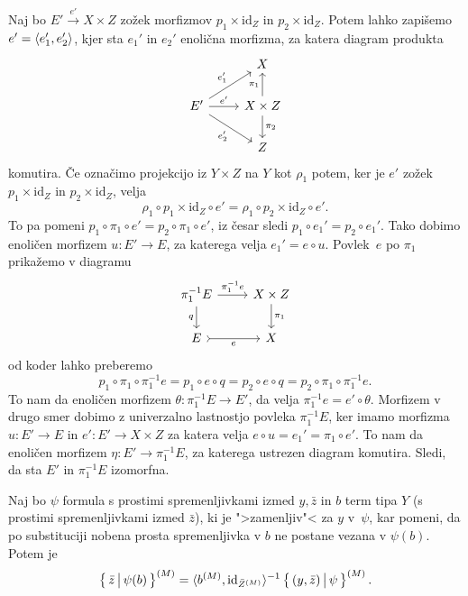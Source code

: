 \documentclass[../kategoricna_logika.tex]{subfiles}
\begin{document}
  \begin{dokaz}
    Naj bo $E' \xrightarrow{e'} X \times Z$ zožek morfizmov
    $p_1 \times \mathrm{id}_Z$ in $p_2 \times \mathrm{id}_Z$. Potem
    lahko zapišemo $e' = \langle e'_1, e'_2 \rangle$, kjer sta $e_1'$ in
    $e_2'$ enolična morfizma, za katera diagram produkta
    \begin{equation*}
      \begin{tikzcd}[row sep = normal]
        & X \\
        E' \ar[ur, "e_1'"] \ar[r, "e'"] \ar[dr, "e_2'"'] & X \times Z
        \ar[u, "\pi_1"] \ar[d, "\pi_2"] \\
        & Z
      \end{tikzcd}
    \end{equation*}
    komutira. Če označimo projekcijo iz $Y \times Z$ na $Y$ kot
    $\rho_1$ potem, ker je $e'$ zožek $p_1 \times \mathrm{id}_Z$ in
    $p_2 \times \mathrm{id}_Z$, velja
    \[ \rho_1 \circ p_1 \times \mathrm{id}_Z \circ e' = \rho_1 \circ
      p_2 \times \mathrm{id}_Z \circ e'.\] To pa pomeni
    $p_1 \circ \pi_1 \circ e' = p_2 \circ \pi_1 \circ e'$, iz česar
    sledi $p_1 \circ e_1' = p_2 \circ e_1'$. Tako dobimo enoličen
    morfizem $u : E' \to E$, za katerega velja $e_1' = e \circ
    u$. Povlek~$e$ po $\pi_1$ prikažemo v diagramu
    \begin{equation*}
      \begin{tikzcd}
        \pi_1^{-1}E \ar[d, "q"'] \ar[r, "\pi_1^{-1}e"] & X \times Z \ar[d, "\pi_1"] \\
        E \ar[r, tail, "e"'] & X
      \end{tikzcd}
    \end{equation*}
    od koder lahko preberemo
    \[ p_1 \circ \pi_1 \circ \pi_1^{-1}e = p_1 \circ e \circ q = p_2
      \circ e \circ q = p_2 \circ \pi_1 \circ \pi_1^{-1}e.\] To nam da
    enoličen morfizem $\theta : \pi_1^{-1}E \to E'$, da velja
    $\pi_1^{-1}e = e' \circ \theta$.  Morfizem v drugo smer dobimo z
    univerzalno lastnostjo povleka $\pi_1^{-1}E$, ker imamo morfizma
    $u : E' \to E$ in $e' : E' \to X \times Z$ za katera velja
    $e \circ u = e_1' = \pi_1 \circ e'$. To nam da enoličen morfizem
    $\eta : E' \to \pi_1^{-1}E$, za katerega ustrezen diagram
    komutira.  Sledi, da sta $E'$ in $\pi_1^{-1}E$ izomorfna.
  \end{dokaz}
  \begin{lema}\label{lema:substitucija}
    Naj bo $\psi$ formula s prostimi spremenljivkami izmed
    $y, \bar{z}$ in $b$ term tipa $Y$ (s prostimi spremenljivkami
    izmed $\bar{z}$), ki je ">zamenljiv"< za $y$ v~$\psi$, kar pomeni,
    da po substituciji nobena prosta spremenljivka v $b$ ne postane
    vezana v $\psi(b)$.  Potem je
  $$\left\lbrace\,\bar{z} \,\middle|\, \psi(b)\,\right\rbrace^{(M)} =
  \langle b^{(M)}, \mathrm{id}_{{\bar{Z}}^{(M)}}\rangle^{-1} \left\lbrace\,(y,
    \bar{z}) \,\middle|\, \psi\,\right\rbrace^{(M)}.$$
\end{lema}
\end{document}
